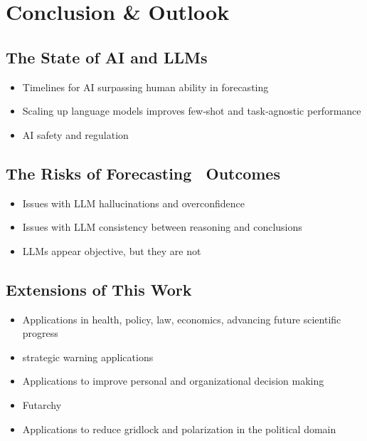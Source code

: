 \documentclass[12pt,a4paper]{article}
\begin{document}
\section*{Conclusion \& Outlook}
\subsection*{The State of AI and LLMs}
\begin{itemize}
  \item Timelines for AI surpassing human ability in forecasting 
  \item Scaling up language models improves few‑shot and task‑agnostic performance 
  \item AI safety and regulation
\end{itemize}
\subsection*{The Risks of Forecasting \DOMAINCAPITALIZED\ Outcomes}
\begin{itemize}
  \item Issues with LLM hallucinations and overconfidence
  \item Issues with LLM consistency between reasoning and conclusions
  \item LLMs appear objective, but they are not
\end{itemize}
\subsection*{Extensions of This Work}
\begin{itemize}
  \item Applications in health, policy, law, economics, advancing future scientific progress
  \item strategic warning applications 
  \item Applications to improve personal and organizational decision making
  \item Futarchy   
  \item Applications to reduce gridlock and polarization in the political domain
\end{itemize}
\clearpage
\printbibliography
\end{document}
